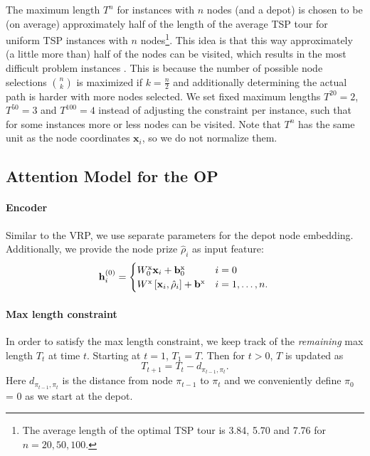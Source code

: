 The maximum length $T^n$ for instances with $n$ nodes (and a depot) is chosen to be (on average) approximately half of the length of the average TSP tour for uniform TSP instances with $n$ nodes\footnote{The average length of the optimal TSP tour is 3.84, 5.70 and 7.76 for $n=20, 50, 100$.}. This idea is that this way approximately (a little more than) half of the nodes can be visited, which results in the most difficult problem instances \citep{vansteenwegen2011orienteering}. This is because the number of possible node selections ${n \choose k}$ is maximized if $k = \frac{n}{2}$ and additionally determining the actual path is harder with more nodes selected. We set fixed maximum lengths $T^{20} = 2$, $T^{50} = 3$ and $T^{100} = 4$ instead of adjusting the constraint per instance, such that for some instances more or less nodes can be visited. Note that $T^n$ has the same unit as the node coordinates $\mathbf{x}_i$, so we do not normalize them.

\subsection{Attention Model for the OP}

\paragraph{Encoder}
Similar to the VRP, we use separate parameters for the depot node embedding. Additionally, we provide the node prize $\hat{\rho}_i$ as input feature:
\begin{equation}
\mathbf{h}_i^{(0)} = \begin{cases}
		W_0^{\text{x}} \mathbf{x}_i + \mathbf{b}_0^{\text{x}} & i = 0 \\
        W^{\text{x}} \left[\mathbf{x}_i, \hat{\rho}_i\right] + \mathbf{b}^{\text{x}} & i = 1, \ldots, n.
\end{cases} \\
\end{equation}

\paragraph{Max length constraint}
In order to satisfy the max length constraint, we keep track of the \emph{remaining} max length $T_t$ at time $t$. Starting at $t = 1$, $T_1 = T$. Then for $t > 0$, $T$ is updated as
\begin{equation}
    T_{t+1} = T_{t} - d_{\pi_{t-1},\pi_{t}}.
\end{equation}
Here $d_{\pi_{t-1},\pi_{t}}$ is the distance from node $\pi_{t-1}$ to $\pi_{t}$ and we conveniently define $\pi_0$ = 0 as we start at the depot.

